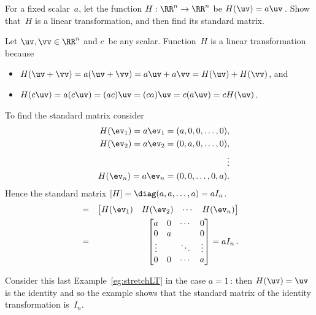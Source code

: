 \begin{example} \label{eg:stretchLT}
For a fixed scalar~\(a\), let the function \(H:\RR^n\to\RR^n\) be \(H(\uv)=a\uv\)\,.  Show that~\(H\) is a linear transformation, and then find its standard matrix.
\begin{solution} 
Let \(\uv,\vv\in\RR^n\) and \(c\)~be any scalar.
Function~\(H\) is a linear transformation because
\begin{itemize}
\item \(H(\uv+\vv)=a(\uv+\vv)=a\uv+a\vv=H(\uv)+H(\vv)\), and
\item \(H(c\uv)=a(c\uv)=(ac)\uv=(ca)\uv=c(a\uv)=cH(\uv)\).
\end{itemize}
To find the standard matrix consider
\begin{eqnarray*}
&&H(\ev_1)=a\ev_1=(a,0,0,\ldots,0),
\\&&H(\ev_2)=a\ev_2=(0,a,0,\ldots,0),
\\&&\qquad\vdots
\\&&H(\ev_n)=a\ev_n=(0,0,\ldots,0,a).
\end{eqnarray*}
Hence the standard matrix \([H]=\diag(a,a,\ldots,a)=aI_n\).
\begin{eqnarray*}
[H]&=&\begin{bmatrix} H(\ev_1)&H(\ev_2)&\cdots&H(\ev_n) \end{bmatrix}
\\&=&\begin{bmatrix} a&0&\cdots&0
\\0&a&&0
\\\vdots&&\ddots&\vdots
\\0&0&\cdots&a \end{bmatrix}
=aI_n\,.
\end{eqnarray*}

\end{solution}
\end{example}

Consider this last Example~\ref{eg:stretchLT} in the case \(a=1\)\,: then \(H(\uv)=\uv\) is the identity and so the example shows that the standard matrix of the identity transformation is~\(I_n\).



